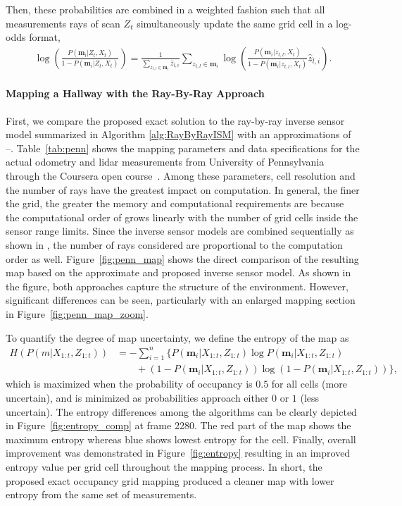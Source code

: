 Then, these probabilities are combined in a weighted fashion such that all measurements rays of scan $Z_t$ simultaneously update the same grid cell in a log-odds format,
\begin{align}
\label{eqn:ISM_Approx_2}
\log\left(\frac{P(\mathbf{m}_i|Z_{t},X_t)}{1-P(\mathbf{m}_i|Z_{t},X_t)}\right)
=
\frac1{\sum_{z_{t,l}\in\mathbf{m}_i}\hat z_{l,i}}\sum_{z_{t,l}\in\mathbf{m}_i}\log\left(\frac{P(\mathbf{m}_i|z_{t,l},X_t)}{1-P(\mathbf{m}_i|z_{t,l},X_t)}\hat z_{l,i}\right).
\end{align}


\paragraph{Mapping a Hallway with the Ray-By-Ray Approach}

First, we compare the proposed exact solution to the ray-by-ray inverse sensor model summarized in Algorithm \ref{alg:RayByRayISM} with an approximations of --.
Table~\ref{tab:penn} shows the mapping parameters and data specifications for the actual odometry and lidar measurements from University of Pennsylvania through the Coursera open course~\cite{coursera}. Among these parameters, cell resolution and the number of rays have the greatest impact on computation. In general, the finer the grid, the greater the memory and computational requirements are because the computational order of  grows linearly with the number of grid cells inside the sensor range limits. Since the inverse sensor models are combined sequentially as shown in , the number of rays considered are proportional to the computation order as well.
Figure~\ref{fig:penn_map} shows the direct comparison of the resulting map based on the approximate and proposed inverse sensor model.
As shown in the figure, both approaches capture the structure of the environment. However, significant differences can be seen, particularly with an enlarged mapping section in Figure~\ref{fig:penn_map_zoom}.

To quantify the degree of map uncertainty, we define the entropy of the map as 
\begin{align*}
H(P(m|X_{1:t},Z_{1:t}))&=-\sum_{i=1}^n\big\{P(\mathbf{m}_i|X_{1:t},Z_{1:t})\log P(\mathbf{m}_i|X_{1:t},Z_{1:t})\nonumber\\
&\qquad+(1-P(\mathbf{m}_i|X_{1:t},Z_{1:t}))\log(1-P(\mathbf{m}_i|X_{1:t},Z_{1:t}))\big\},
\end{align*}
which is maximized when the probability of occupancy is $0.5$ for all cells (more uncertain), and is minimized as probabilities approach either $0$ or $1$ (less uncertain). 
The entropy differences among the algorithms can be clearly depicted in Figure~\ref{fig:entropy_comp} at frame 2280.
The red part of the map shows the maximum  entropy whereas blue shows lowest entropy for the cell.
Finally, overall improvement was demonstrated in Figure~\ref{fig:entropy} resulting in an improved entropy value per grid cell throughout the mapping process.
In short, the proposed exact occupancy grid mapping produced a cleaner map with lower entropy from the same set of measurements.


